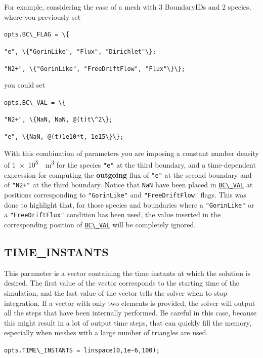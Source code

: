 \documentclass[12pt,a4paper]{article}
\newcommand{\matlabs}[1]{{\lstinline[style=MatlabStyle]!#1!}}
\newcommand{\seclink}[2]{%
	\begingroup
	\hypersetup{linkcolor=orange}%
	\hyperref[sec:#1]{\matlabs{#2}}%
	\endgroup
}
\begin{document}
	For example, considering the case of a mesh with 3 BoundaryIDs and 2 species, where you previously set
	
	\matlabs{opts.BC\_FLAG = \{}

	\hspace{40pt} \matlabs{"e", \{"GorinLike", "Flux", "Dirichlet"\};}
	
	\hspace{40pt} \matlabs{"N2+", \{"GorinLike", "FreeDriftFlow", "Flux"\}\};}
	
	\noindent you could set
	
	\matlabs{opts.BC\_VAL = \{}
	
	\hspace{40pt} \matlabs{"N2+", \{NaN, NaN, @(t)t\^2\};}
	
	\hspace{40pt} \matlabs{"e", \{NaN, @(t)1e10*t, 1e15\}\};}
		
	\noindent With this combination of parameters you are imposing a constant number density of \SI{1e5}{\per\cubic\meter} for the species \matlabs{"e"} at the third boundary, and a time-dependent expression for computing the \textbf{outgoing} flux of \matlabs{"e"} at the second boundary and of \matlabs{"N2+"} at the third boundary. Notice that \matlabs{NaN} have been placed in \seclink{bcval}{BC\_VAL} at positions corresponding to \matlabs{"GorinLike"} and \matlabs{"FreeDriftFlow"} flags. This was done to highlight that, for those species and boundaries where a \matlabs{"GorinLike"} or a \matlabs{"FreeDriftFlux"} condition has been used, the value inserted in the corresponding position of \seclink{bcval}{BC\_VAL} will be completely ignored.
	
	
	
	
	\subsection{TIME\_INSTANTS}
	\label{sec:timeinst}
	This parameter is a vector containing the time instants at which the solution is desired. The first value of the vector corresponds to the starting time of the simulation, and the last value of the vector tells the solver when to stop integration. 
	If a vector with only two elements is provided, the solver will output all the steps that have been internally performed. Be careful in this case, because this might result in a lot of output time steps, that can quickly fill the memory, especially when meshes with a large number of triangles are used.
	
	\matlabs{opts.TIME\_INSTANTS = linspace(0,1e-6,100);}
	
\end{document}
